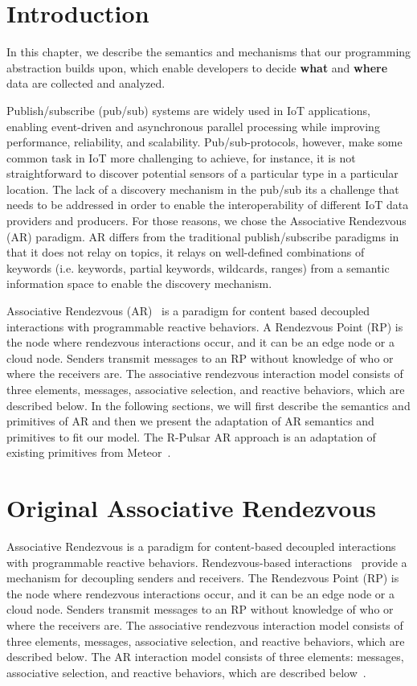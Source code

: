 \section{Introduction}

In this chapter, we describe the semantics and mechanisms that our programming abstraction builds upon, which enable developers to decide \textbf{what} and \textbf{where} data are collected and analyzed. 

Publish/subscribe (pub/sub) systems are widely used in IoT applications, enabling event-driven and asynchronous parallel processing while improving performance, reliability, and scalability. Pub/sub-protocols, however, make some common task in IoT more challenging to achieve, for instance, it is not straightforward to discover potential sensors of a particular type in a particular location. The lack of a discovery mechanism in the pub/sub its a challenge that needs to be addressed in order to enable the interoperability of different IoT data providers and producers. For those reasons, we chose the Associative Rendezvous (AR) paradigm. AR differs from the traditional publish/subscribe paradigms in that it does not relay on topics, it relays on well-defined combinations of keywords (i.e. keywords, partial keywords, wildcards, ranges) from a semantic information space to enable the discovery mechanism.

Associative Rendezvous (AR)~\cite{AR} is a paradigm for content based decoupled interactions with programmable reactive behaviors. A Rendezvous Point (RP) is the node where rendezvous interactions occur, and it can be an edge node or a cloud node. Senders transmit messages to an RP without knowledge of who or where the receivers are. The associative rendezvous interaction model consists of three elements, messages, associative selection, and reactive behaviors, which are described below. In the following sections, we will first describe the semantics and primitives of AR and then we present the adaptation of AR semantics and primitives to fit our model. The R-Pulsar AR approach is an adaptation of existing primitives from Meteor~\cite{meteor2008}.

\section{Original Associative Rendezvous} 
Associative Rendezvous is a paradigm for content-based decoupled interactions with programmable reactive behaviors. Rendezvous-based interactions~\cite{AR} provide a mechanism for decoupling senders and receivers. The Rendezvous Point (RP) is the node where rendezvous interactions occur, and it can be an edge node or a cloud node. Senders transmit messages to an RP without knowledge of who or where the receivers are. The associative rendezvous interaction model consists of three elements, messages, associative selection, and reactive behaviors, which are described below. The AR interaction model consists of three elements: messages, associative selection, and reactive behaviors, which are described below~\cite{meteor2008}.


